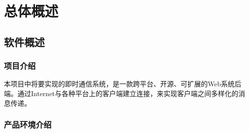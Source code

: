 \chapter{总体概述}


\section{软件概述}
\subsection{项目介绍}

本项目中将要实现的即时通信系统，是一款跨平台、开源、可扩展的Web系统后端。通过Internet与各种平台上的客户端建立连接，来实现客户端之间多样化的消息传递。

\subsection{产品环境介绍}

